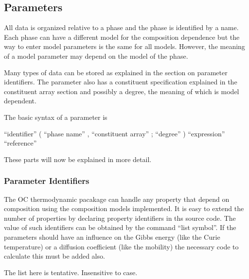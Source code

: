 \documentclass[12pt]{article}
\begin{document}
\subsection{Parameters}

All data is organized relative to a phase and the phase is identified
by a name.  Each phase can have a different model for the composition
dependence but the way to enter model parameters is the same for all
models.  However, the meaning of a model parameter may depend on the
model of the phase.

Many types of data can be stored as explained in the section on
parameter identifiers.  The parameter also has a constituent
specification explained in the constituent array section and possibly
a degree, the meaning of which is model dependent.

The basic syntax of a parameter is

``identifier'' ( ``phase name'' , ``constituent array'' ; ``degree'' ) ``expression'' ``reference''

These parts will now be explained in more detail.

\subsubsection{Parameter Identifiers}\label{sc:paramid}

The OC thermodynamic pacakage can handle any property that depend on
composition using the composition models implemented.  It is easy to
extend the number of properties by declaring property identifiers in
ths source code.  The value of such identifiers can be obtained by the
command ``list symbol''.  If the parameters should have an influence
on the Gibbs energy (like the Curie temperature) or a diffusion
coefficient (like the mobility) the necessary code to calculate this
must be added also.

The list here is tentative.  Insensitive to case.
\end{document}

